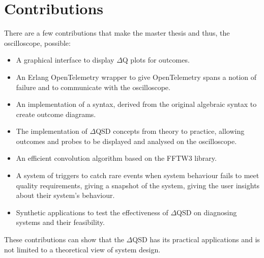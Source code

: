 \section{Contributions}
    There are a few contributions that make the master thesis and thus, the oscilloscope, possible:
    \begin{itemize}
        \item A graphical interface to display $\Delta$Q plots for outcomes.
        \item An Erlang OpenTelemetry wrapper to give OpenTelemetry spans a notion of failure and to communicate with the oscilloscope.
        \item An implementation of a syntax, derived from the original algebraic syntax to create outcome diagrams. 
        \item The implementation of $\Delta$QSD concepts from theory to practice, allowing outcomes and probes to be displayed and analysed on the oscilloscope.
        \item An efficient convolution algorithm based on the FFTW3 library.
        \item A system of triggers to catch rare events when system behaviour fails to meet quality requirements, giving a snapshot of the system, giving the user insights about their system's behaviour.
        \item Synthetic applications to test the effectiveness of $\Delta$QSD on diagnosing systems and their feasibility.
    \end{itemize}
    These contributions can show that the $\Delta$QSD has its practical applications and is not limited to a theoretical view of system design.

